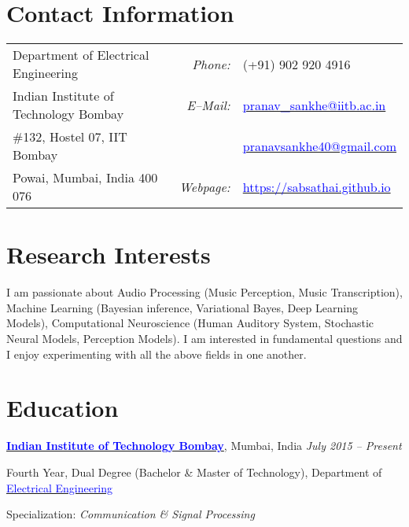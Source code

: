 \documentclass[margin,line]{res}
\newenvironment{list1}{
  \begin{list}{\ding{113}}{%
      \setlength{\itemsep}{0in}
      \setlength{\parsep}{0in} \setlength{\parskip}{0in}
      \setlength{\topsep}{0in} \setlength{\partopsep}{0in} 
      \setlength{\leftmargin}{0.17in}}}{\end{list}}
\begin{document}

\begin{resume}
\section{\sc Contact Information}
\vspace{.05in}
\begin{tabular}{@{}p{2.9in}p{.5in}p{3in}}
Department of Electrical Engineering & \multicolumn{1}{r}{\it Phone:}  &(+91) 902 920 4916 \\            
Indian Institute of Technology Bombay &\multicolumn{1}{r}{\it E--Mail:}& \href{mailto:pranav_sankhe@iitb.ac.in}{\textcolor{blue}{pranav\_sankhe@iitb.ac.in}} \\ 
\#132, Hostel 07, IIT Bombay & & \href{mailto:pranavsankhe40@gmail.com}{\textcolor{blue}{pranavsankhe40@gmail.com}} \\ 
Powai, Mumbai, India 400 076 & \multicolumn{1}{r}{\it Webpage:} &\href{https://sabsathai.github.io}{\textcolor{blue}{https://sabsathai.github.io}} \\     
\end{tabular}

\section{\sc Research Interests}
\lettrine[lines=2]{I}{} am passionate about Audio Processing (Music Perception, Music Transcription), Machine Learning (Bayesian inference, Variational Bayes, Deep Learning Models), Computational Neuroscience (Human Auditory System, Stochastic Neural Models, Perception Models). I am interested in fundamental questions and I enjoy experimenting with all the above fields in one another.

\section{\sc Education}
{\bf \href{http://www.iitb.ac.in/}{\textcolor{blue}{Indian Institute of Technology Bombay}}}, Mumbai, India \hfill {\it July 2015 -- Present} \\
\vspace*{-.1in}
\begin{list1}
\item[] Fourth Year, Dual Degree (Bachelor \& Master of Technology), Department of \href{http://www.ee.iitb.ac.in/}{\textcolor{blue}{Electrical Engineering}}
\item[] Specialization: {\em Communication \& Signal Processing}
\end{list1}


\end{resume}
\end{document}
